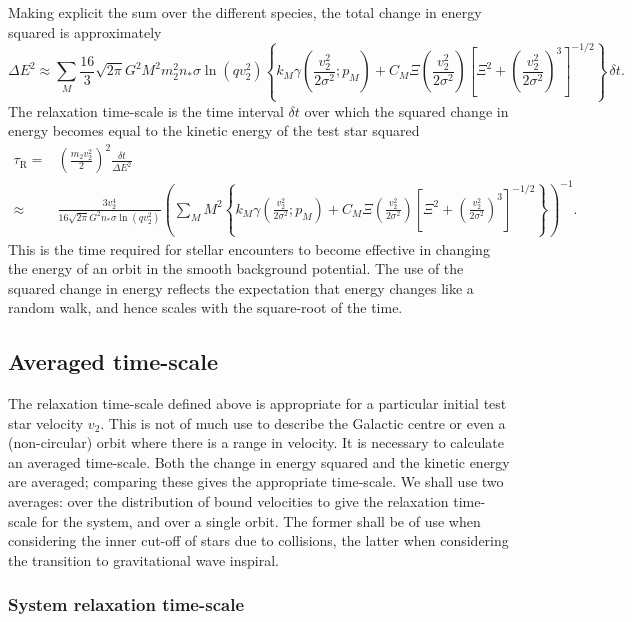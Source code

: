 \documentclass[useAMS,usedcolumn,usegraphicx,usenatbib]{mn2e}
\newcommand{\sub}[1]{\ensuremath{_\mathrm{#1}}}
\begin{document}
\begin{onecolumn}
Making explicit the sum over the different species, the total change in energy squared is approximately
\begin{equation}
\Delta E^2 \approx \sum_M \frac{16}{3}\sqrt{2\pi}G^2 M^2m_2^2n_\ast\sigma\ln\left(qv_2^2\right) \left\{k_M \gamma\left(\frac{v_2^2}{2\sigma^2};p_M\right) + C_M\Xi\left(\frac{v_2^2}{2\sigma^2}\right)\left[\Xi^2 + \left(\frac{v_2^2}{2\sigma^2}\right)^3\right]^{-1/2}\right\}\,\delta t.
\end{equation}
The relaxation time-scale is the time interval $\delta t$ over which the squared change in energy becomes equal to the kinetic energy of the test star squared \citep{Bar-Or2012}
\begin{align}
\tau\sub{R} = {} & \left(\frac{m_2v_2^2}{2}\right)^2\frac{\delta t}{\Delta E^2} \\
 \approx {} & \frac{3v_2^4}{16\sqrt{2\pi}G^2n_\ast\sigma\ln\left(qv_2^2\right)} \left(\sum_M M^2 \left\{k_M \gamma\left(\frac{v_2^2}{2\sigma^2};p_M\right) + C_M\Xi\left(\frac{v_2^2}{2\sigma^2}\right)\left[\Xi^2 + \left(\frac{v_2^2}{2\sigma^2}\right)^3\right]^{-1/2}\right\}\right)^{-1}.
\end{align}
This is the time required for stellar encounters to become effective in changing the energy of an orbit in the smooth background potential. The use of the squared change in energy reflects the expectation that energy changes like a random walk, and hence scales with the square-root of the time.

\subsection{Averaged time-scale}

The relaxation time-scale defined above is appropriate for a particular initial test star velocity $v_2$. This is not of much use to describe the Galactic centre or even a (non-circular) orbit where there is a range in velocity. It is necessary to calculate an averaged time-scale. Both the change in energy squared and the kinetic energy are averaged; comparing these gives the appropriate time-scale. We shall use two averages: over the distribution of bound velocities to give the relaxation time-scale for the system, and over a single orbit. The former shall be of use when considering the inner cut-off of stars due to collisions, the latter when considering the transition to gravitational wave inspiral.

\subsubsection{System relaxation time-scale}\label{sec:system-ave}


\end{onecolumn}
\end{document}
